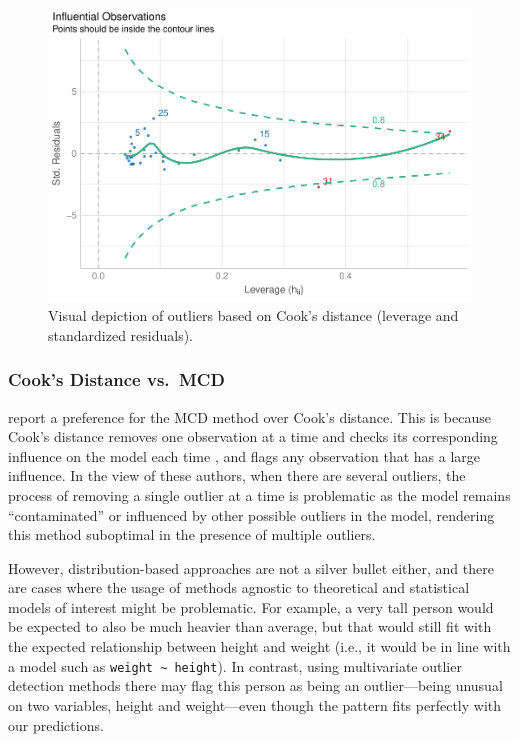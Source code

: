 \documentclass[mathematics,article,submit,moreauthors,pdftex]{mdpi}
\begin{document}
\begin{figure}
\includegraphics[width=1\linewidth]{paper_files/figure-latex/model-1} \caption{Visual depiction of outliers based on Cook's distance (leverage and standardized residuals).}\label{fig:model}
\end{figure}

\hypertarget{cooks-distance-vs.-mcd}{%
\subsubsection{Cook's Distance vs.~MCD}\label{cooks-distance-vs.-mcd}}

\citet{leys2018outliers} report a preference for the MCD method over
Cook's distance. This is because Cook's distance removes one observation
at a time and checks its corresponding influence on the model each time
\citep{cook1977detection}, and flags any observation that has a large
influence. In the view of these authors, when there are several
outliers, the process of removing a single outlier at a time is
problematic as the model remains ``contaminated'' or influenced by other
possible outliers in the model, rendering this method suboptimal in the
presence of multiple outliers.

However, distribution-based approaches are not a silver bullet either,
and there are cases where the usage of methods agnostic to theoretical
and statistical models of interest might be problematic. For example, a
very tall person would be expected to also be much heavier than average,
but that would still fit with the expected relationship between height
and weight (i.e., it would be in line with a model such as
\texttt{weight\ \textasciitilde{}\ height}). In contrast, using
multivariate outlier detection methods there may flag this person as
being an outlier---being unusual on two variables, height and
weight---even though the pattern fits perfectly with our predictions.
\end{document}
